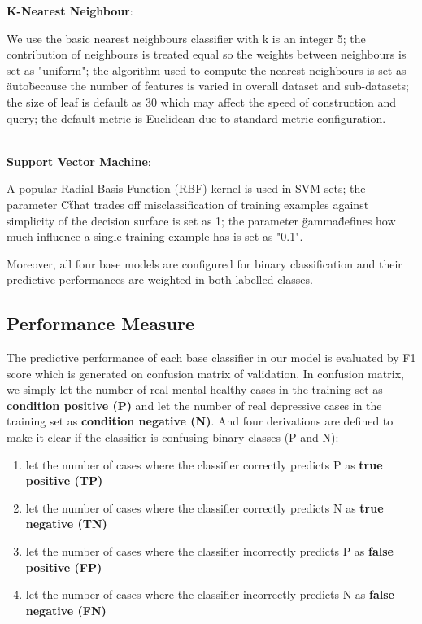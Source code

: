 \documentclass[10pt,journal,compsoc]{IEEEtran}
\begin{document}
	\textbf{K-Nearest Neighbour}: 
	\begin{description} 
		 \item \hspace{0.5cm} We use the basic nearest neighbours classifier with k is an integer 5; 
		 the contribution of neighbours is treated equal so the weights between neighbours is set as "uniform"; 
		 the algorithm used to compute the nearest neighbours is set as \"auto\" because the number of features is varied in overall dataset and sub-datasets;
		 the size of leaf is default as 30 which may affect the speed of construction and query; 
		 the default metric is Euclidean due to standard metric configuration.\\\\
	\end{description}
	
	\textbf{Support Vector Machine}: 
	\begin{description} 
		 \item \hspace{0.5cm} A popular Radial Basis Function (RBF) kernel is used in SVM sets; 
		  the parameter \"C\" that trades off misclassification of training examples against simplicity of the decision surface is set as 1; 
		  the parameter \"gamma\" defines how much influence a single training example has is set as "0.1". 
	\end{description}

Moreover, all four base models are configured for binary classification and their predictive performances are weighted in both labelled classes. 
\medskip
%
%
\subsection{Performance Measure}
The predictive performance of each base classifier in our model is evaluated by F1 score which is generated on confusion matrix of validation. In confusion matrix, we simply let the number of real mental healthy cases in the training set as \textbf{condition positive (P)} and let the number of real depressive cases in the training set as  \textbf{condition negative (N)}. And four derivations are defined to make it clear if the classifier is confusing binary classes (P and N):  \\
\begin{enumerate}[label=(\roman*)]
\item let the number of cases where the classifier correctly predicts P as \textbf{ true positive (TP)}
\item let the number of cases where the classifier correctly predicts N as \textbf{true negative (TN)}
\item let the number of cases where the classifier incorrectly predicts P as \textbf{false positive (FP)}
\item let the number of cases where the classifier incorrectly predicts N as \textbf{false negative (FN)}
\end{enumerate}
\end{document}
